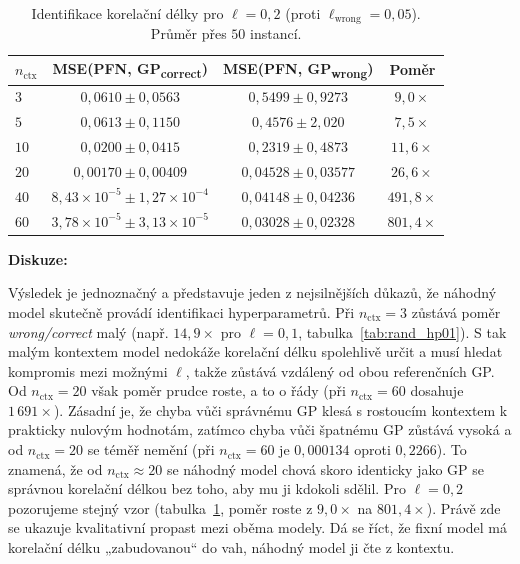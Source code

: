 \begin{table}[htbp]
\centering
\begin{tabular}{lccc}
\hline
$n_{\text{ctx}}$ & MSE(PFN, GP\textsubscript{correct}) & MSE(PFN, GP\textsubscript{wrong}) & Poměr \\
\hline
$3$  & $0{,}0610 \pm 0{,}0563$ & $0{,}5499 \pm 0{,}9273$ & $9{,}0\times$ \\
$5$  & $0{,}0613 \pm 0{,}1150$ & $0{,}4576 \pm 2{,}020$ & $7{,}5\times$ \\
$10$ & $0{,}0200 \pm 0{,}0415$ & $0{,}2319 \pm 0{,}4873$ & $11{,}6\times$ \\
$20$ & $0{,}00170 \pm 0{,}00409$ & $0{,}04528 \pm 0{,}03577$ & $26{,}6\times$ \\
$40$ & $8{,}43 \times 10^{-5} \pm 1{,}27 \times 10^{-4}$ & $0{,}04148 \pm 0{,}04236$ & $491{,}8\times$ \\
$60$ & $3{,}78 \times 10^{-5} \pm 3{,}13 \times 10^{-5}$ & $0{,}03028 \pm 0{,}02328$ & $801{,}4\times$ \\
\hline
\end{tabular}
\caption{Identifikace korelační délky pro $\ell = 0{,}2$ (proti $\ell_{\text{wrong}} = 0{,}05$). Průměr přes $50$ instancí.}
\label{tab:rand_hp02}
\end{table}

\textbf{Diskuze:}

Výsledek je jednoznačný a představuje jeden z nejsilnějších důkazů, že náhodný model skutečně provádí identifikaci hyperparametrů.
Při $n_{\text{ctx}} = 3$ zůstává poměr \emph{wrong/correct} malý (např. $14{,}9\times$ pro $\ell = 0{,}1$, tabulka~\ref{tab:rand_hp01}).
S tak malým kontextem model nedokáže korelační délku spolehlivě určit a musí hledat kompromis mezi možnými $\ell$, takže zůstává vzdálený od obou referenčních GP.
Od $n_{\text{ctx}} = 20$ však poměr prudce roste, a to o řády (při $n_{\text{ctx}} = 60$ dosahuje $1\,691\times$).
Zásadní je, že chyba vůči správnému GP klesá s rostoucím kontextem k prakticky nulovým hodnotám, zatímco chyba vůči špatnému GP zůstává vysoká a od $n_{\text{ctx}} = 20$ se téměř nemění (při $n_{\text{ctx}} = 60$ je $0{,}000134$ oproti $0{,}2266$).
To znamená, že od $n_{\text{ctx}} \approx 20$ se náhodný model chová skoro identicky jako GP se správnou korelační délkou bez toho, aby mu ji kdokoli sdělil.
Pro $\ell = 0{,}2$ pozorujeme stejný vzor (tabulka~\ref{tab:rand_hp02}, poměr roste z $9{,}0\times$ na $801{,}4\times$).
Právě zde se ukazuje kvalitativní propast mezi oběma modely.
Dá se říct, že fixní model má korelační délku „zabudovanou“ do vah, náhodný model ji čte z kontextu.

